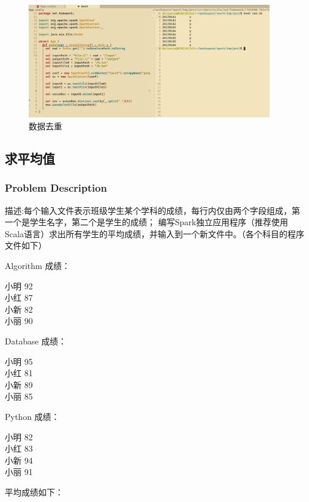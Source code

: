 \documentclass{article}
\begin{document}
    \begin{figure}[h]
      \begin{center}
        \includegraphics[width=0.95\textwidth]{./figures/1.jpg}
      \end{center}
      \caption{数据去重}
    \end{figure}


    \subsection{求平均值}

    \subsubsection{Problem Description}

    描述:每个输入文件表示班级学生某个学科的成绩，每行内仅由两个字段组成，第一个是学生名字，第二个是学生的成绩；
    编写Spark独立应用程序（推荐使用Scala语言）求出所有学生的平均成绩，并输入到一个新文件中。（各个科目的程序文件如下）

    Algorithm 成绩：

    \noindent 小明 92 \\
    小红 87 \\
    小新 82 \\
    小丽 90

    Database 成绩：

    \noindent 小明 95 \\
    小红 81 \\
    小新 89 \\
    小丽 85

    Python 成绩：

    \noindent 小明 82 \\
    小红 83 \\
    小新 94 \\
    小丽 91

    平均成绩如下：
\end{document}
